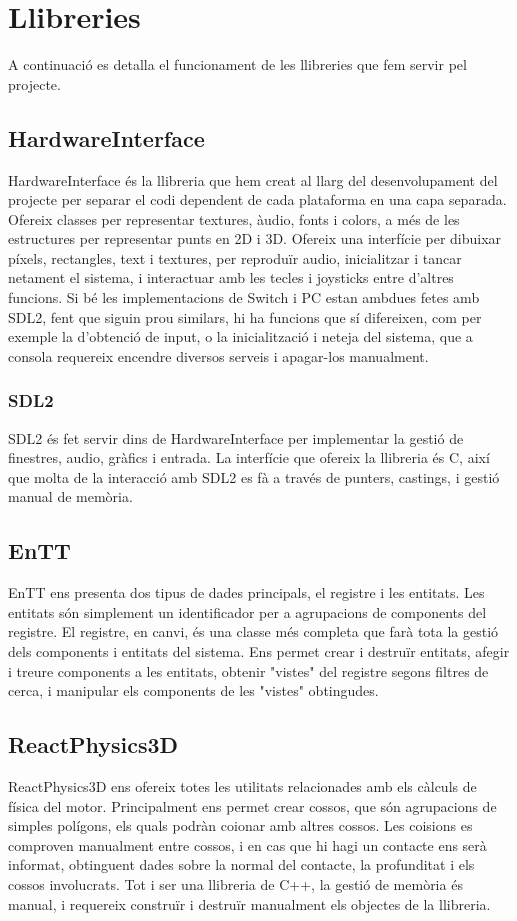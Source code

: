 \section{Llibreries}
A continuació es detalla el funcionament de les llibreries que fem servir pel projecte.
\subsection{HardwareInterface}
HardwareInterface és la llibreria que hem creat al llarg del desenvolupament del projecte per separar el codi dependent de cada plataforma en una capa separada.
Ofereix classes per representar textures, àudio, fonts i colors, a més de les estructures per representar punts en 2D i 3D. Ofereix una interfície per dibuixar píxels, rectangles, text i textures, per reproduïr audio, inicialitzar i tancar netament el sistema, i interactuar amb les tecles i joysticks entre d'altres funcions.
Si bé les implementacions de Switch i PC estan ambdues fetes amb SDL2, fent que siguin prou similars, hi ha funcions que sí difereixen, com per exemple la d'obtenció de input, o la inicialització i neteja del sistema, que a consola requereix encendre diversos serveis i apagar-los manualment.
\subsubsection{SDL2}
SDL2 és fet servir dins de HardwareInterface per implementar la gestió de finestres, audio, gràfics i entrada. La interfície que ofereix la llibreria és C, així que molta de la interacció amb SDL2 es fà a través de punters, castings, i gestió manual de memòria.
\subsection{EnTT}
EnTT ens presenta dos tipus de dades principals, el registre i les entitats. Les entitats són simplement un identificador per a agrupacions de components del registre. El registre, en canvi, és una classe més completa que farà tota la gestió dels components i entitats del sistema. Ens permet crear i destruïr entitats, afegir i treure components a les entitats, obtenir "vistes" del registre segons filtres de cerca, i manipular els components de les "vistes" obtingudes.
\subsection{ReactPhysics3D}
ReactPhysics3D ens ofereix totes les utilitats relacionades amb els càlculs de física del motor. Principalment ens permet crear cossos, que són agrupacions de simples polígons, els quals podràn co\lgem ionar amb altres cossos. Les co\lgem isions es comproven manualment entre cossos, i en cas que hi hagi un contacte ens serà informat, obtinguent dades sobre la normal del contacte, la profunditat i els cossos involucrats. 
Tot i ser una llibreria de C++, la gestió de memòria és manual, i requereix construïr i destruïr manualment els objectes de la llibreria.
